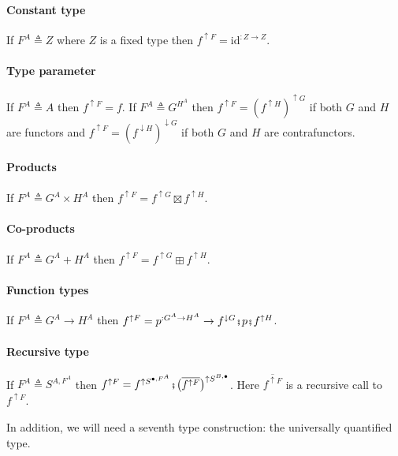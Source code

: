 \paragraph{Constant type}

If $F^{A}\triangleq Z$ where $Z$ is a fixed type then $f^{\uparrow F}=\text{id}^{:Z\rightarrow Z}$.

\paragraph{Type parameter}

If $F^{A}\triangleq A$ then $f^{\uparrow F}=f$. If $F^{A}\triangleq G^{H^{A}}$
then $f^{\uparrow F}=(f^{\uparrow H})^{\uparrow G}$ if both $G$
and $H$ are functors and $f^{\uparrow F}=(f^{\downarrow H})^{\downarrow G}$
if both $G$ and $H$ are contrafunctors.

\paragraph{Products}

If $F^{A}\triangleq G^{A}\times H^{A}$ then $f^{\uparrow F}=f^{\uparrow G}\boxtimes f^{\uparrow H}$.

\paragraph{Co-products}

If $F^{A}\triangleq G^{A}+H^{A}$ then $f^{\uparrow F}=f^{\uparrow G}\boxplus f^{\uparrow H}$.

\paragraph{Function types}

If $F^{A}\triangleq G^{A}\rightarrow H^{A}$ then $f^{\uparrow F}=p^{:G^{A}\rightarrow H^{A}}\rightarrow f^{\downarrow G}\bef p\bef f^{\uparrow H}$.

\paragraph{Recursive type}

If $F^{A}\triangleq S^{A,F^{A}}$ then $f^{\uparrow F}=f^{\uparrow S^{\bullet,F^{A}}}\bef\big(\overline{f^{\uparrow F}}\big)^{\uparrow S^{B,\bullet}}$.
Here $\overline{f^{\uparrow F}}$ is a recursive call to $f^{\uparrow F}$.

In addition, we will need a seventh type construction: the universally
quantified type.

